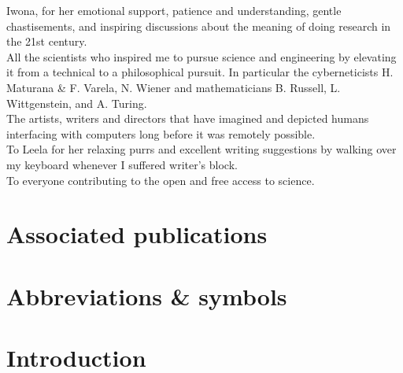\documentclass[11pt]{book} %
\begin{document}
\noindent
Iwona, for her emotional support, patience and understanding, gentle chastisements,
and inspiring discussions about the meaning of doing research in the 21st century.\\

\noindent
All the scientists who inspired me to pursue science and engineering by elevating it
from a technical to a philosophical pursuit. In particular the cyberneticists
H. Maturana \& F. Varela, N. Wiener and mathematicians B. Russell, L. Wittgenstein, and A. Turing. \\

\noindent
The artists, writers and directors that have imagined and depicted
humans interfacing with computers long before it was remotely possible.\\

\noindent
To Leela for her relaxing purrs and excellent writing suggestions
by walking over my keyboard whenever I suffered writer's block.\\

\noindent
To everyone contributing to the open and free access to science.


\chapter*{Associated publications}
\label{fm:publications}


\chapter*{Abbreviations \& symbols}
\label{fm:abbreviations}



\mainmatter %

\chapter{Introduction}
\label{ch1:introduction}


\end{document}
